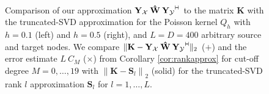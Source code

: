 \documentclass[11pt,a4paper,twoside,bibtotoc]{scrartcl}
\theoremstyle{plain}
\theoremstyle{definition}
\theoremstyle{remark}
\newcommand{\adj}{{\vdash \hspace*{-1.72mm} \dashv}}
\numberwithin{equation}{section}
\numberwithin{table}{section}
\numberwithin{figure}{section}
\begin{document}
\begin{figure}[tb]
  \centering
  \hfill
  \\
  \caption{Comparison of our approximation $\mathbf{Y_{\mathcal{X}}} \: \mathbf{\hat W} \: 
  \mathbf{Y_{\mathcal{Y}}}^{\adj}$ to the matrix $\mathbf{K}$ with the truncated-SVD approximation
  for the Poisson kernel $Q_{h}$ with $h=0.1$ (left) and $h=0.5$ (right), 
  and $L = D = 400$ arbitrary source and target nodes. 
  We compare 
  $\|\mathbf{K} - \mathbf{Y_{\mathcal{X}}} \: \mathbf{\hat W} \: \mathbf{Y_{\mathcal{Y}}}^{\adj}\|_{2}$ 
  ($+$) and the error estimate $L \: C_{M}$ ($\times$) from Corollary \ref{cor:rankapprox} 
  for cut-off degree $M=0,\ldots,19$ with 
  $\left\|\mathbf{K} - \mathbf{S}_{l}\right\|_{2}$ (solid) for 
  the truncated-SVD rank $l$ approximation $\mathbf{S}_{l}$ for $l=1,\ldots,L$.
  }
  \label{fig:rankapprox}
\end{figure}
\end{document}
